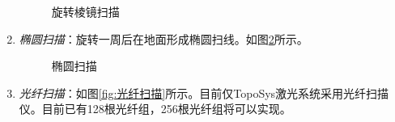 \begin{enumerate}
\begin{figure}[htbp]
			\caption{旋转棱镜扫描}
			\label{fig:旋转棱镜扫描}
		\end{figure}
	\item \textit{椭圆扫描}：旋转一周后在地面形成椭圆扫线。如图\ref{fig:椭圆扫描}所示。
		\begin{figure}[htbp]
			\centering
			\quad
			\quad
			\caption{椭圆扫描}
			\label{fig:椭圆扫描}
		\end{figure}
	\item \textit{光纤扫描}：如图\ref{fig:光纤扫描}所示。目前仅TopoSys激光系统采用光纤扫描仪。目前已有128根光纤组，256根光纤组将可以实现。
		\begin{figure}[htbp]
			\centering

\end{figure}
\end{enumerate}
